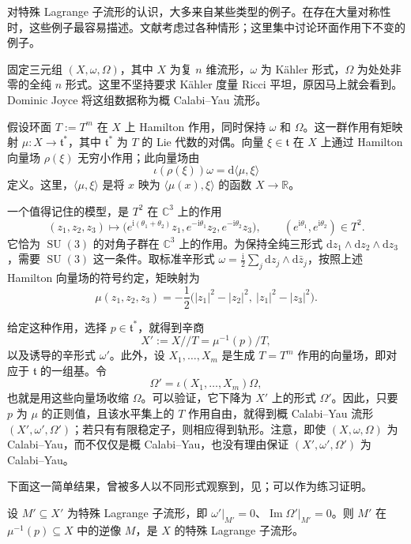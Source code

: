 对特殊 Lagrange 子流形的认识，大多来自某些类型的例子。在存在大量对称性时，这些例子最容易描述。文献考虑过各种情形；这里集中讨论环面作用下不变的例子。

固定三元组 $(X,\omega,\Omega)$，其中 $X$ 为复 $n$ 维流形，$\omega$ 为 Kähler 形式，$\Omega$ 为处处非零的全纯 $n$ 形式。这里不坚持要求 Kähler 度量 Ricci 平坦，原因马上就会看到。Dominic Joyce 将这组数据称为概 Calabi--Yau 流形。

假设环面 $T:=T^m$ 在 $X$ 上 Hamilton 作用，同时保持 $\omega$ 和 $\Omega$。这一群作用有矩映射 $\mu\colon X\to\mathfrak t^*$，其中 $\mathfrak t^*$ 为 $T$ 的 Lie 代数的对偶。向量 $\xi\in\mathfrak t$ 在 $X$ 上通过 Hamilton 向量场 $\rho(\xi)$ 无穷小作用；此向量场由
\[
\iota(\rho(\xi))\omega=\mathrm d\langle\mu,\xi\rangle
\]
定义。这里，$\langle\mu,\xi\rangle$ 是将 $x$ 映为 $\langle\mu(x),\xi\rangle$ 的函数 $X\to\mathbb R$。

一个值得记住的模型，是 $T^2$ 在 $\mathbb C^3$ 上的作用
\[
(z_1,z_2,z_3)\longmapsto
\bigl(e^{\mathrm i(\theta_1+\theta_2)}z_1,
e^{-\mathrm i\theta_1}z_2,e^{-\mathrm i\theta_2}z_3\bigr),
\qquad(e^{\mathrm i\theta_1},e^{\mathrm i\theta_2})\in T^2.
\]
它恰为 $\operatorname{SU}(3)$ 的对角子群在 $\mathbb C^3$ 上的作用。为保持全纯三形式 $\mathrm dz_1\wedge\mathrm dz_2\wedge\mathrm dz_3$，需要 $\operatorname{SU}(3)$ 这一条件。取标准辛形式 $\omega=\tfrac{\mathrm i}{2}\sum_j\mathrm dz_j\wedge\mathrm d\bar z_j$，按照上述 Hamilton 向量场的符号约定，矩映射为
\[
\mu(z_1,z_2,z_3)
=-\frac12\bigl(|z_1|^2-|z_2|^2,\ |z_1|^2-|z_3|^2\bigr).
\]

给定这种作用，选择 $p\in\mathfrak t^*$，就得到辛商
\[
X':=X/\!/T=\mu^{-1}(p)/T,
\]
以及诱导的辛形式 $\omega'$。此外，设 $X_1,\ldots,X_m$ 是生成 $T=T^m$ 作用的向量场，即对应于 $\mathfrak t$ 的一组基。令
\[
\Omega'=\iota(X_1,\ldots,X_m)\Omega,
\]
也就是用这些向量场收缩 $\Omega$。可以验证，它下降为 $X'$ 上的形式 $\Omega'$。因此，只要 $p$ 为 $\mu$ 的正则值，且该水平集上的 $T$ 作用自由，就得到概 Calabi--Yau 流形 $(X',\omega',\Omega')$；若只有有限稳定子，则相应得到轨形。注意，即使 $(X,\omega,\Omega)$ 为 Calabi--Yau，而不仅仅是概 Calabi--Yau，也没有理由保证 $(X',\omega',\Omega')$ 为 Calabi--Yau。

下面这一简单结果，曾被多人以不同形式观察到，见；可以作为练习证明。
\begin{proposition}\label{prop:7.6}
设 $M'\subseteq X'$ 为特殊 Lagrange 子流形，即 $\omega'|_{M'}=0$、$\operatorname{Im}\Omega'|_{M'}=0$。则 $M'$ 在 $\mu^{-1}(p)\subseteq X$ 中的逆像 $M$，是 $X$ 的特殊 Lagrange 子流形。
\end{proposition}

